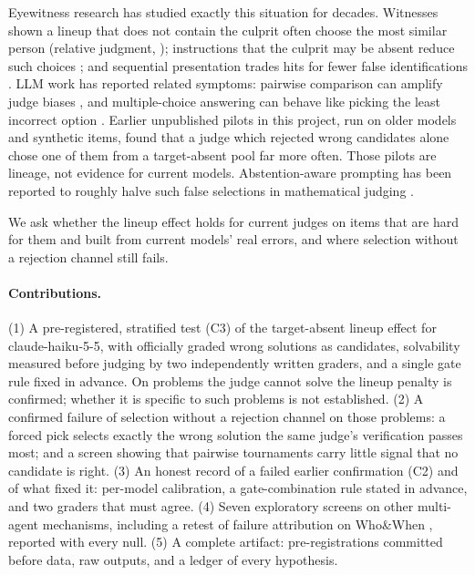 \documentclass[10pt,twocolumn]{article}
\begin{document}
Eyewitness research has studied exactly this situation for decades. Witnesses shown a lineup that does not contain the culprit often choose the most similar person (relative judgment, \citealp{wells1984psychology}); instructions that the culprit may be absent reduce such choices \citep{malpass1981eyewitness}; and sequential presentation trades hits for fewer false identifications \citep{steblay2001eyewitness,steblay2011seventytwo}. LLM work has reported related symptoms: pairwise comparison can amplify judge biases \citep{jeong2025comparative}, and multiple-choice answering can behave like picking the least incorrect option \citep{wang2025llms}. Earlier unpublished pilots in this project, run on older models and synthetic items, found that a judge which rejected wrong candidates alone chose one of them from a target-absent pool far more often. Those pilots are lineage, not evidence for current models. Abstention-aware prompting has been reported to roughly halve such false selections in mathematical judging \citep{okonkwo2025abstention}.

We ask whether the lineup effect holds for current judges on items that are hard for them and built from current models' real errors, and where selection without a rejection channel still fails.

\paragraph{Contributions.}
(1) A pre-registered, stratified test (C3) of the target-absent lineup effect for claude-haiku-5-5, with officially graded wrong solutions as candidates, solvability measured before judging by two independently written graders, and a single gate rule fixed in advance. On problems the judge cannot solve the lineup penalty is confirmed; whether it is specific to such problems is not established. (2) A confirmed failure of selection without a rejection channel on those problems: a forced pick selects exactly the wrong solution the same judge's verification passes most; and a screen showing that pairwise tournaments carry little signal that no candidate is right. (3) An honest record of a failed earlier confirmation (C2) and of what fixed it: per-model calibration, a gate-combination rule stated in advance, and two graders that must agree. (4) Seven exploratory screens on other multi-agent mechanisms, including a retest of failure attribution on Who\&When \citep{zhang2025which}, reported with every null. (5) A complete artifact: pre-registrations committed before data, raw outputs, and a ledger of every hypothesis.
\end{document}
